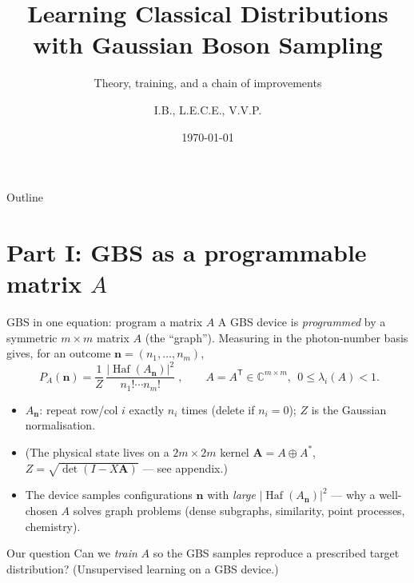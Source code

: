 \documentclass[10pt,aspectratio=169]{beamer}
\title[GBS distribution learning]{Learning Classical Distributions with Gaussian Boson Sampling}
\subtitle{Theory, training, and a chain of improvements}
\author{I.B., L.E.C.E., V.V.P.}
\institute{Lab seminar}
\date{\today}
\newcommand{\Haf}{\operatorname{Haf}}
\newcommand{\vn}{\mathbf{n}}
\begin{document}
\begin{frame}\titlepage\end{frame}

\begin{frame}{Outline}
\tableofcontents
\end{frame}

\section{Part I: GBS as a programmable matrix $A$}

\begin{frame}{GBS in one equation: program a matrix $A$}
A GBS device is \emph{programmed} by a symmetric $m\times m$ matrix $A$ (the
``graph''). Measuring in the photon-number basis gives, for an outcome
$\vn=(n_1,\dots,n_m)$,
\[
\boxed{\;P_A(\vn)=\frac{1}{Z}\,\frac{\big|\Haf(A_{\vn})\big|^{2}}{n_1!\cdots n_m!}\;},
\qquad A=A^{\mathsf T}\in\mathbb C^{m\times m},\ \ 0\le\lambda_i(A)<1 .
\]
\begin{itemize}
  \item $A_{\vn}$: repeat row/col $i$ exactly $n_i$ times (delete if $n_i=0$);
        $Z$ is the Gaussian normalisation.
  \item {\footnotesize (The physical state lives on a $2m\times2m$ kernel
        $\mathbf A=A\oplus A^\ast$, $Z=\sqrt{\det(I-X\mathbf A)}$ --- see appendix.)}
  \item The device samples configurations $\vn$ with \emph{large}
        $|\Haf(A_{\vn})|^2$ --- why a well-chosen $A$ solves graph problems
        (dense subgraphs, similarity, point processes, chemistry).
\end{itemize}
\begin{block}{Our question}
Can we \emph{train} $A$ so the GBS samples reproduce a prescribed target
distribution? (Unsupervised learning on a GBS device.)
\end{block}
\end{frame}
\end{document}
